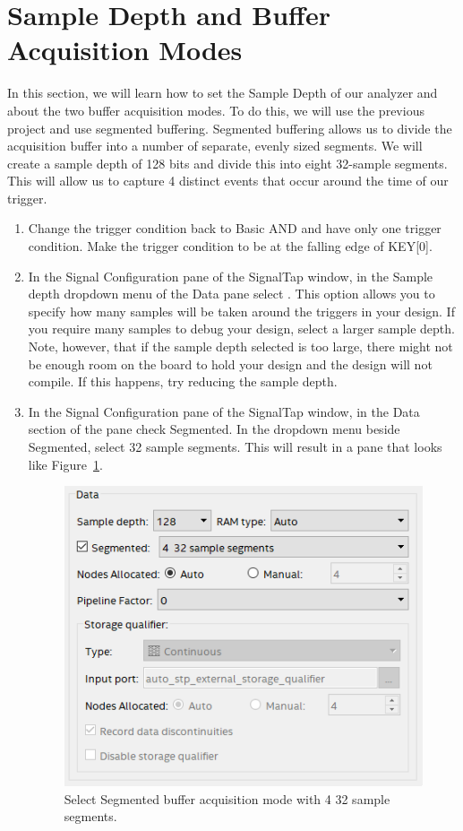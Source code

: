 \documentclass[11pt, twoside, pdftex]{article}
\begin{document}
\section{Sample Depth and Buffer Acquisition Modes}
In this section, we will learn how to set the Sample Depth of our analyzer and about the two buffer acquisition modes.
To do this, we will use the previous project and use segmented buffering. Segmented buffering allows us to divide the acquisition
buffer into a number of separate, evenly sized segments. We will create a sample depth of 128 bits and divide this into
eight 32-sample segments. This will allow us to capture 4 distinct events that occur around the time of our trigger.
\begin{enumerate}
\item Change the trigger condition back to Basic AND and have only one trigger condition.
Make the trigger condition to be at the falling edge of KEY[0].
  
\item In the Signal Configuration pane of the SignalTap window, in the {\sf Sample depth} dropdown menu of the Data pane select {}. This option allows you to specify how many samples will be taken around the triggers
in your design. If you require many samples to debug your design, select a larger sample depth. Note, however, that if
the sample depth selected is too large, there might not be enough room on the board to hold your design
and the design will not compile. If this happens, try reducing the sample depth.
  
\item In the Signal Configuration pane of the SignalTap window, in the Data section of the pane check {\sf Segmented}.
In the dropdown menu beside Segmented, select { 32 sample segments}. This will result in a pane that looks like
Figure~\ref{fig:23}.
  
\begin{figure}[H]
   \begin{center}
      \includegraphics[scale=0.65]{figures/figure23.png}
   \caption{Select Segmented buffer acquisition mode with 4 32 sample segments.} 
	 \label{fig:23}
	 \end{center}
\end{figure}


\end{enumerate}
\end{document}
